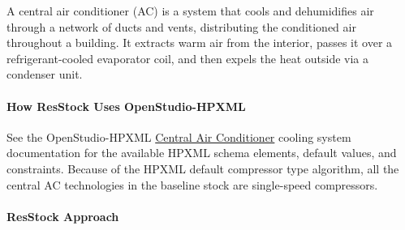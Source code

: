 A central air conditioner (AC) is a system that cools and dehumidifies air through a network of ducts and vents, distributing the conditioned air throughout a building. It extracts warm air from the interior, passes it over a refrigerant-cooled evaporator coil, and then expels the heat outside via a condenser unit. 

\paragraph{How ResStock Uses OpenStudio-HPXML}

See the OpenStudio-HPXML \href{https://openstudio-hpxml.readthedocs.io/en/v1.8.1/workflow_inputs.html#central-air-conditioner}{Central Air Conditioner} cooling system documentation for the available HPXML schema elements, default values, and constraints.  Because of the HPXML default compressor type algorithm, all the central AC technologies in the baseline stock are single-speed compressors. 

\paragraph{ResStock Approach}

